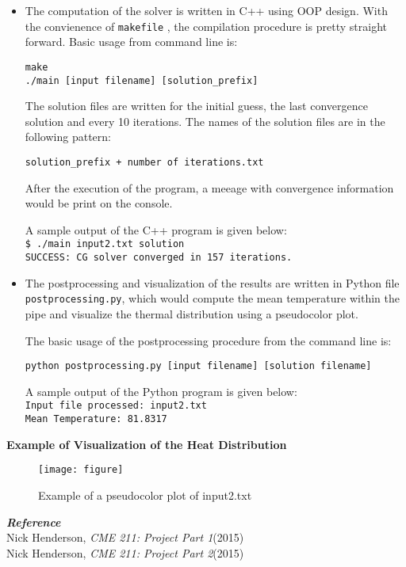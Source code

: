 \documentclass[11pt]{article} %
\begin{document}
\begin{itemize}

\item The computation of the solver is written in C++ using OOP design. With the convienence of \texttt{makefile} , the compilation procedure is pretty straight forward. Basic usage from command line is:

\smallskip
\texttt{make\\}
\texttt{./main [input filename] [solution\_prefix]}
\bigskip

The solution files are written for the initial guess, the last convergence solution and every 10 iterations. The names of the solution files are in the following pattern:
\begin{center}
\texttt{solution\_prefix + number of iterations.txt\\}
\end{center}
After the execution of the program, a meeage with convergence information would be print on the console.

A sample output of the C++ program is given below:
\smallskip\\
\texttt{\$ ./main input2.txt solution\\
SUCCESS: CG solver converged in 157 iterations.}
\smallskip

\item The postprocessing and visualization of the results are written in Python file \texttt{postprocessing.py}, which would compute the mean temperature within the pipe and visualize the thermal distribution using a pseudocolor plot.

The basic usage of the postprocessing procedure from the command line is:

\smallskip
\texttt{python postprocessing.py [input filename] [solution filename]}
\smallskip

A sample output of the Python program is given below:
\bigskip\\
\texttt{Input file processed: input2.txt\\Mean Temperature: 81.8317\\}
\end{itemize}

\noindent
\textbf{\Large{Example of Visualization of the Heat Distribution}}

\begin{figure}[h]
\texttt{[image: figure]}
\centering
\caption{Example of a pseudocolor plot of input2.txt}
\end{figure}

\newpage
\noindent
\textbf{\textit{\Large{Reference}}}
\bigskip
\\Nick Henderson, \textit{CME 211: Project Part 1}(2015)\\
Nick Henderson, \textit{CME 211: Project Part 2}(2015)
\end{document}
